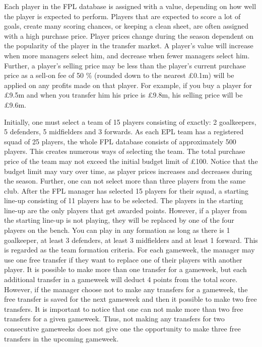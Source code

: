 Each player in the FPL database is assigned with a value, depending on how well the player is expected to perform. Players that are expected to score a lot of goals, create many scoring chances, or keeping a clean sheet, are often assigned with a high purchase price. Player prices change during the season dependent on the popularity of the player in the transfer market. A player's value will increase when more managers select him, and decrease when fewer managers select him. Further, a player's selling price may be less than the player's current purchase price as a sell-on fee of 50 \% (rounded down to the nearest \pounds 0.1m) will be applied on any profits made on that player. For example, if you buy a player for \pounds 9.5m and when you transfer him his price is \pounds 9.8m, his selling price will be \pounds 9.6m.

\newpar
Initially, one must select a team of 15 players consisting of exactly: 2 goalkeepers, 5 defenders, 5 midfielders and 3 forwards. As each EPL team has a registered squad of 25 players, the whole FPL database consists of approximately 500 players. This creates numerous ways of selecting the team. The total purchase price of the team may not exceed the initial budget limit of £100. Notice that the budget limit may vary over time, as player prices increases and decreases during the season. Further, one can not select more than three players from the same club. After the FPL manager has selected 15 players for their squad, a starting line-up consisting of 11 players has to be selected. The players in the starting line-up are the only players that get awarded points. However, if a player from the starting line-up is not playing, they will be replaced by one of the four players on the bench. You can play in any formation as long as there is 1 goalkeeper, at least 3 defenders, at least 3 midfielders and at least 1 forward. This is regarded as the team formation criteria.
\newpar
For each gameweek, the manager may use one free transfer if they want to replace one of their players with another player. It is possible to make more than one transfer for a gameweek, but each additional transfer in a gameweek will deduct 4 points from the total score. However, if the manager choose not to make any transfers for a gameweek, the free transfer is saved for the next gameweek and then it possible to make two free transfers. It is important to notice that one can not make more than two free transfers for a given gameweek. Thus, not making any transfers for two consecutive gameweeks does not give one the opportunity to make three free transfers in the upcoming gameweek. 


